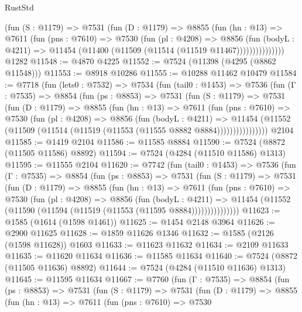 \begin{lexlean}{RustStd}
\begin{coremodule}
              (fun (S : @1179) =>
              @7531
                (fun (D : @1179) =>
                @8855
                  (fun (hn : @13) =>
                  @7611
                    (fun (pns : @7610) =>
                    @7530
                      (fun (pl : @4208) =>
                      @8856
                        (fun (bodyL : @4211) =>
                        @11454 (@11400 (@11509 (@11514 (@11519 @11467)))))))))))))))
    @1282
@11548 := @4870 @4225
@11552 := @7524 (@11398 (@4295 (@8862 @11548)))
@11553 := @8918 @10286
@11555 := @10288 @11462 @10479
@11584 := @7718
    (fun (lets0 : @7532) =>
    @7534
      (fun (tail0 : @1453) =>
      @7536
        (fun (Γ : @7535) =>
        @8854
          (fun (ps : @8853) =>
          @7531
            (fun (S : @1179) =>
            @7531
              (fun (D : @1179) =>
              @8855
                (fun (hn : @13) =>
                @7611
                  (fun (pns : @7610) =>
                  @7530
                    (fun (pl : @4208) =>
                    @8856
                      (fun (bodyL : @4211) =>
                      @11454
                        (@11552 (@11509 (@11514 (@11519 (@11553 (@11555 @8882 @8884))))))))))))))))
    @2104
@11585 := @1419 @2104
@11586 := @11585 @8884
@11590 := @7524 (@8872 (@11505 @11586) @8892)
@11594 := @7524 (@4284 (@11510 @11586) @1313)
@11595 := @11555 @2104
@11620 := @7742
    (fun (tail0 : @1453) =>
    @7536
      (fun (Γ : @7535) =>
      @8854
        (fun (ps : @8853) =>
        @7531
          (fun (S : @1179) =>
          @7531
            (fun (D : @1179) =>
            @8855
              (fun (hn : @13) =>
              @7611
                (fun (pns : @7610) =>
                @7530
                  (fun (pl : @4208) =>
                  @8856
                    (fun (bodyL : @4211) =>
                    @11454 (@11552 (@11590 (@11594 (@11519 (@11553 (@11595 @8884)))))))))))))))
@11623 := @1585 (@1614 (@1598 @1461))
@11625 := @1454 @2148 @3964
@11626 := @2900 @11625
@11628 := @1859 @11626 @1346
@11632 := @1585 (@2126 (@1598 @11628)) @1603
@11633 := @11623 @11632
@11634 := @2109 @11633
@11635 := @11620 @11634
@11636 := @11585 @11634
@11640 := @7524 (@8872 (@11505 @11636) @8892)
@11644 := @7524 (@4284 (@11510 @11636) @1313)
@11645 := @11595 @11634
@11667 := @7760
    (fun (Γ : @7535) =>
    @8854
      (fun (ps : @8853) =>
      @7531
        (fun (S : @1179) =>
        @7531
          (fun (D : @1179) =>
          @8855
            (fun (hn : @13) =>
            @7611
              (fun (pns : @7610) =>
              @7530

\end{coremodule}
\end{lexlean}
